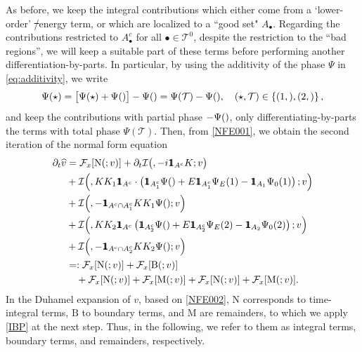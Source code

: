 \documentclass[a4paper,
11pt,  reqno]{amsart}
\makeatletter
\newcommand{\mathbbm}[1]{\mathchoice%
    {\hbox{\sffamily 1\kern-.40em 1}}%
    {\hbox{\sffamily 1\kern-.40em 1}}%
    {\hbox{\scriptsize\sffamily 1\kern-.30em 1}}%
    {\hbox{\tiny\sffamily 1\kern-.25em 1}}}%
\newcommand{\5}{\textup{V}}
\newcommand{\ft}{\widehat}
\newcommand{\ind}{\mathbbm 1}
\newcommand{\dt}{\partial_t}
\theoremstyle{remark}
\newcommand{\bul}{\bullet}
\newcommand{\TT}{\mathcal{T}}
\newcommand{\Ft}{{\mathcal{F}}}
\def\<#1>{\csname MH@symb@#1\endcsname}
\newcommand{\Ical}{\mathcal{I}}
\numberwithin{equation}{section}
\numberwithin{theorem}{section}
\newcommand{\MM}{\mathrm{M}}
\newcommand{\NN}{\mathrm{N}}
\newcommand{\BB}{\mathrm{B}}
\providecommand{\DIFaddtex}[1]{{\protect\color{blue}\uwave{#1}}} %
\providecommand{\DIFdeltex}[1]{{\protect\color{red}\sout{#1}}}                      %
\providecommand{\DIFaddbegin}{} %
\providecommand{\DIFaddend}{} %
\providecommand{\DIFdelbegin}{} %
\providecommand{\DIFdelend}{} %
\providecommand{\DIFadd}[1]{\texorpdfstring{\DIFaddtex{#1}}{#1}} %
\providecommand{\DIFdel}[1]{\texorpdfstring{\DIFdeltex{#1}}{}} %
\makeatother
\begin{document}
As before, we keep the integral contributions which either come from a `lower-order' \DIFdelbegin \DIFdel{/}\DIFdelend \DIFaddbegin \DIFadd{or }\DIFaddend energy term, or which are localized to a ``good set" $A_\bul$. Regarding the contributions restricted to $A_\bul^c$ for all $\bul\in \TT^0$, despite the restriction to the ``bad regions'', we will keep a suitable part of these terms before performing another differentiation-by-parts. In particular, by using the additivity of the phase $\Psi$ in \eqref{eq:additivity}, we write
\begin{align}
\Psi(\star) 
= \big[ \Psi(\star) + \Psi(\<1>) \big]- \Psi(\<1>) 
=
\Psi(\TT) - \Psi(\<1>),
\quad (\star, \TT)\in \left\{ (1, \<21>) , (2, \<22>) \right\},
\end{align}
and keep the contributions with partial phase $-\Psi(\<1>)$, only differentiating-by-parts the terms with total phase $\Psi(\TT)$. Then, from \eqref{NFE001}, we obtain the second iteration of the normal form equation
\begin{align}
\dt\ft v
&
= 
 \Ft_x[ \NN ( \<1>; v )] 
+ 
\dt \Ical \big( \<1>, - i  \ind_{A^c} K; v \big)
\\
&
+
\Ical \Big( \<21>,  K K_1 \ind_{A^c} \cdot \left( \ind_{A_1^c} \Psi(\<1>) + E \ind_{A_1^c}  \Psi_E(1) - \ind_{A_1} \Psi_0(1) \right); v  \Big) 
\\
&
+
\Ical \Big( \<21>, - \ind_{A^c \cap A_1^c} KK_1\Psi(\<21>) ; v  \Big) 
\\
&
+
\Ical \Big( \<22>, KK_2 \ind_{A^c} \left( \ind_{A_2^c} \Psi(\<1>) + E \ind_{A_2^c} \Psi_E(2) - \ind_{A_2} \Psi_0(2)\right) ; v  \Big) 
\\
&
+
\Ical \Big( \<22>, - \ind_{A^c \cap A_2^c} KK_2\Psi(\<22>) ; v  \Big) 
\\
&
= : 
 \Ft_x[ \NN ( \<1>; v )]  
+ 
 \Ft_x[ 
\BB(\<1>;v)
] 
\\
&
\quad 
+ 
 \Ft_x[ 
\NN(\<21>; v )
] 
+
 \Ft_x[ 
\MM(\<21>; v )
] 
+
 \Ft_x[ 
\NN(\<22>; v)
]  
+
 \Ft_x[ 
\MM(\<22>;v)
]  
.
\label{NFE002}
\end{align}
In the Duhamel expansion of $v$, based on \eqref{NFE002}, $\NN$ corresponds to time-integral terms, $\BB$ to boundary terms, and $\MM$ are remainders, to which we apply \eqref{IBP} at the next step. Thus, in the following, we refer to them as integral terms, boundary terms, and remainders, respectively.
\end{document}
